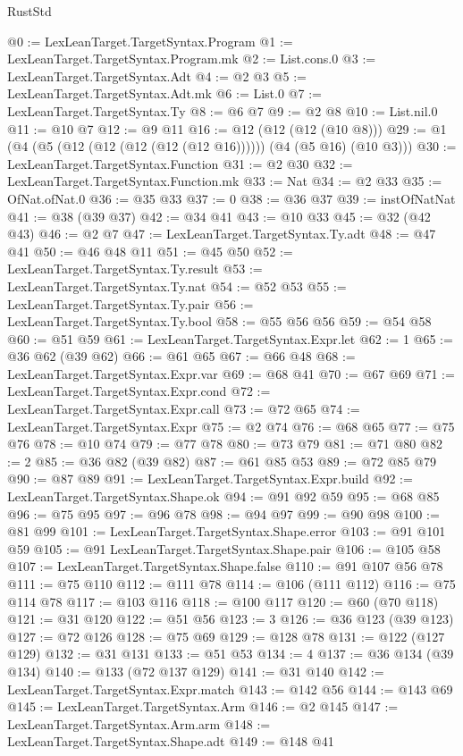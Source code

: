 \begin{lexlean}{RustStd}
\begin{coremodule}
@0 := LexLeanTarget.TargetSyntax.Program
@1 := LexLeanTarget.TargetSyntax.Program.mk
@2 := List.cons.{0}
@3 := LexLeanTarget.TargetSyntax.Adt
@4 := @2 @3
@5 := LexLeanTarget.TargetSyntax.Adt.mk
@6 := List.{0}
@7 := LexLeanTarget.TargetSyntax.Ty
@8 := @6 @7
@9 := @2 @8
@10 := List.nil.{0}
@11 := @10 @7
@12 := @9 @11
@16 := @12 (@12 (@12 (@10 @8)))
@29 := @1 (@4 (@5 (@12 (@12 (@12 (@12 (@12 @16)))))) (@4 (@5 @16) (@10 @3)))
@30 := LexLeanTarget.TargetSyntax.Function
@31 := @2 @30
@32 := LexLeanTarget.TargetSyntax.Function.mk
@33 := Nat
@34 := @2 @33
@35 := OfNat.ofNat.{0}
@36 := @35 @33
@37 := 0
@38 := @36 @37
@39 := instOfNatNat
@41 := @38 (@39 @37)
@42 := @34 @41
@43 := @10 @33
@45 := @32 (@42 @43)
@46 := @2 @7
@47 := LexLeanTarget.TargetSyntax.Ty.adt
@48 := @47 @41
@50 := @46 @48 @11
@51 := @45 @50
@52 := LexLeanTarget.TargetSyntax.Ty.result
@53 := LexLeanTarget.TargetSyntax.Ty.nat
@54 := @52 @53
@55 := LexLeanTarget.TargetSyntax.Ty.pair
@56 := LexLeanTarget.TargetSyntax.Ty.bool
@58 := @55 @56 @56
@59 := @54 @58
@60 := @51 @59
@61 := LexLeanTarget.TargetSyntax.Expr.let
@62 := 1
@65 := @36 @62 (@39 @62)
@66 := @61 @65
@67 := @66 @48
@68 := LexLeanTarget.TargetSyntax.Expr.var
@69 := @68 @41
@70 := @67 @69
@71 := LexLeanTarget.TargetSyntax.Expr.cond
@72 := LexLeanTarget.TargetSyntax.Expr.call
@73 := @72 @65
@74 := LexLeanTarget.TargetSyntax.Expr
@75 := @2 @74
@76 := @68 @65
@77 := @75 @76
@78 := @10 @74
@79 := @77 @78
@80 := @73 @79
@81 := @71 @80
@82 := 2
@85 := @36 @82 (@39 @82)
@87 := @61 @85 @53
@89 := @72 @85 @79
@90 := @87 @89
@91 := LexLeanTarget.TargetSyntax.Expr.build
@92 := LexLeanTarget.TargetSyntax.Shape.ok
@94 := @91 @92 @59
@95 := @68 @85
@96 := @75 @95
@97 := @96 @78
@98 := @94 @97
@99 := @90 @98
@100 := @81 @99
@101 := LexLeanTarget.TargetSyntax.Shape.error
@103 := @91 @101 @59
@105 := @91 LexLeanTarget.TargetSyntax.Shape.pair
@106 := @105 @58
@107 := LexLeanTarget.TargetSyntax.Shape.false
@110 := @91 @107 @56 @78
@111 := @75 @110
@112 := @111 @78
@114 := @106 (@111 @112)
@116 := @75 @114 @78
@117 := @103 @116
@118 := @100 @117
@120 := @60 (@70 @118)
@121 := @31 @120
@122 := @51 @56
@123 := 3
@126 := @36 @123 (@39 @123)
@127 := @72 @126
@128 := @75 @69
@129 := @128 @78
@131 := @122 (@127 @129)
@132 := @31 @131
@133 := @51 @53
@134 := 4
@137 := @36 @134 (@39 @134)
@140 := @133 (@72 @137 @129)
@141 := @31 @140
@142 := LexLeanTarget.TargetSyntax.Expr.match
@143 := @142 @56
@144 := @143 @69
@145 := LexLeanTarget.TargetSyntax.Arm
@146 := @2 @145
@147 := LexLeanTarget.TargetSyntax.Arm.arm
@148 := LexLeanTarget.TargetSyntax.Shape.adt
@149 := @148 @41

\end{coremodule}
\end{lexlean}
